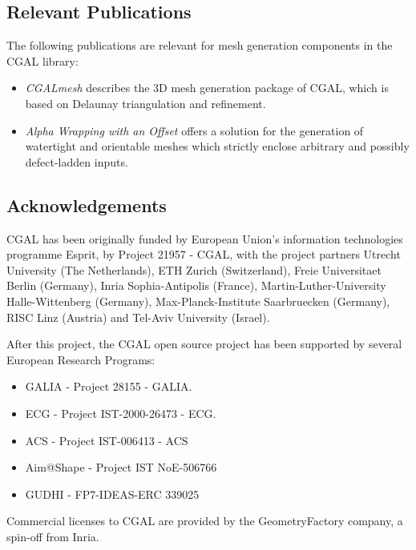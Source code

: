 \subsection{Relevant Publications}
\label{sec:CGAL:publications}

The following publications are relevant for mesh generation components in the CGAL library:

\begin{itemize}
\item \textit{CGALmesh} \cite{jamin_cgalmesh_2015} describes the 3D mesh generation package of CGAL, which is based on Delaunay triangulation and refinement.
\item \textit{Alpha Wrapping with an Offset} \cite{portaneri_alpha_2022} offers a solution for the generation of watertight and orientable meshes which strictly enclose arbitrary and possibly defect-ladden inputs.
\end{itemize}


\subsection{Acknowledgements}
\label{sec::CGAL:acknowledgements}

%
%



CGAL has been originally funded by European Union's information technologies programme Esprit, by Project 21957 - CGAL, with the project partners Utrecht University (The Netherlands), ETH Zurich (Switzerland), Freie Universitaet Berlin (Germany), Inria Sophia-Antipolis (France), Martin-Luther-University Halle-Wittenberg (Germany), Max-Planck-Institute Saarbruecken (Germany), RISC Linz (Austria) and Tel-Aviv University (Israel).

After this project, the CGAL open source project has been supported by several European Research Programs:
\begin{itemize}
\item GALIA - Project 28155 - GALIA.
\item ECG -  Project IST-2000-26473 - ECG.
\item ACS - Project IST-006413 - ACS
\item Aim@Shape - Project IST NoE-506766
\item GUDHI - FP7-IDEAS-ERC 339025
\end{itemize}

Commercial licenses to CGAL are provided by the GeometryFactory company, a spin-off from Inria.


